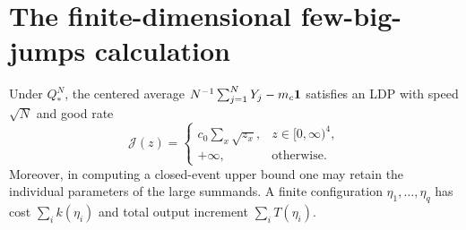 \documentclass[11pt]{article}
\begin{document}
\section{The finite-dimensional few-big-jumps calculation}
\begin{lemma}
Under $Q_*^N$, the centered average
$N^{-1}\sum_{j=1}^NY_j-m_c\mathbf 1$ satisfies an LDP with speed $\sqrt N$
and good rate
\[
 \mathcal J(z)=
 \begin{cases}
 c_0\sum_x\sqrt{z_x},&z\in[0,\infty)^4,\\
 +\infty,&\text{otherwise}.
 \end{cases}                                                \tag{6}
\]
Moreover, in computing a closed-event upper bound one may retain the
individual parameters of the large summands. A finite configuration
$\eta_1,\ldots,\eta_q$ has cost $\sum_i k(\eta_i)$ and total
output increment $\sum_iT(\eta_i)$.
\end{lemma}
\end{document}
